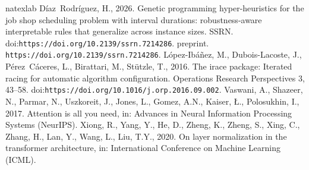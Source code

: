 \documentclass[preprint,12pt]{elsarticle}
\providecommand{\doi}[1]{\href{https://doi.org/#1}{\nolinkurl{https://doi.org/#1}}}
\begin{document}
\begin{thebibliography}{4}
\expandafter\ifx\csname natexlab\endcsname\relax\def\natexlab#1{#1}\fi
\providecommand{\url}[1]{\texttt{#1}}
\providecommand{\href}[2]{#2}
\providecommand{\path}[1]{#1}
\providecommand{\DOIprefix}{doi:}
\providecommand{\ArXivprefix}{arXiv:}
\providecommand{\URLprefix}{URL: }
\providecommand{\Pubmedprefix}{pmid:}
\providecommand{\doi}[1]{\href{http://dx.doi.org/#1}{\path{#1}}}
\providecommand{\Pubmed}[1]{\href{pmid:#1}{\path{#1}}}
\providecommand{\bibinfo}[2]{#2}
\ifx\xfnm\relax \def\xfnm[#1]{\unskip,\space#1}\fi
\bibinfo{author}{D{\'i}az~Rodr{\'i}guez, H.}, \bibinfo{year}{2026}.
\newblock \bibinfo{title}{Genetic programming hyper-heuristics for the job shop
  scheduling problem with interval durations: robustness-aware interpretable
  rules that generalize across instance sizes}.
\newblock \bibinfo{howpublished}{SSRN}.
\newblock \DOIprefix\doi{10.2139/ssrn.7214286}. \bibinfo{note}{preprint.
  \doi{10.2139/ssrn.7214286}}.
\bibinfo{author}{L{\'o}pez-Ib{\'a}{\~n}ez, M.},
  \bibinfo{author}{Dubois-Lacoste, J.}, \bibinfo{author}{P{\'e}rez~C{\'a}ceres,
  L.}, \bibinfo{author}{Birattari, M.}, \bibinfo{author}{St{\"u}tzle, T.},
  \bibinfo{year}{2016}.
\newblock \bibinfo{title}{The irace package: Iterated racing for automatic
  algorithm configuration}.
\newblock \bibinfo{journal}{Operations Research Perspectives}
  \bibinfo{volume}{3}, \bibinfo{pages}{43--58}.
\newblock \DOIprefix\doi{10.1016/j.orp.2016.09.002}.
\bibinfo{author}{Vaswani, A.}, \bibinfo{author}{Shazeer, N.},
  \bibinfo{author}{Parmar, N.}, \bibinfo{author}{Uszkoreit, J.},
  \bibinfo{author}{Jones, L.}, \bibinfo{author}{Gomez, A.N.},
  \bibinfo{author}{Kaiser, {\L}.}, \bibinfo{author}{Polosukhin, I.},
  \bibinfo{year}{2017}.
\newblock \bibinfo{title}{Attention is all you need}, in:
  \bibinfo{booktitle}{Advances in Neural Information Processing Systems
  ({NeurIPS})}.
\bibinfo{author}{Xiong, R.}, \bibinfo{author}{Yang, Y.}, \bibinfo{author}{He,
  D.}, \bibinfo{author}{Zheng, K.}, \bibinfo{author}{Zheng, S.},
  \bibinfo{author}{Xing, C.}, \bibinfo{author}{Zhang, H.},
  \bibinfo{author}{Lan, Y.}, \bibinfo{author}{Wang, L.}, \bibinfo{author}{Liu,
  T.Y.}, \bibinfo{year}{2020}.
\newblock \bibinfo{title}{On layer normalization in the transformer
  architecture}, in: \bibinfo{booktitle}{International Conference on Machine
  Learning ({ICML})}.

\end{thebibliography}
\end{document}
